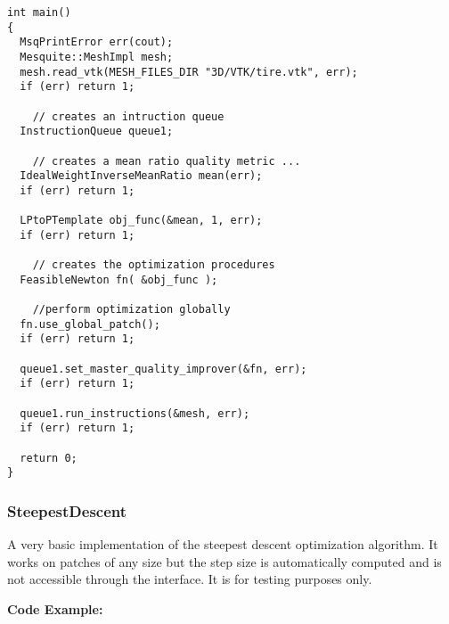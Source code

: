 \begin{lstlisting}[frame=single]
int main()
{     
  MsqPrintError err(cout);
  Mesquite::MeshImpl mesh;
  mesh.read_vtk(MESH_FILES_DIR "3D/VTK/tire.vtk", err);
  if (err) return 1;
  
    // creates an intruction queue
  InstructionQueue queue1;

    // creates a mean ratio quality metric ...
  IdealWeightInverseMeanRatio mean(err);
  if (err) return 1;
  
  LPtoPTemplate obj_func(&mean, 1, err);
  if (err) return 1;
  
    // creates the optimization procedures
  FeasibleNewton fn( &obj_func );

    //perform optimization globally
  fn.use_global_patch();
  if (err) return 1;
  
  queue1.set_master_quality_improver(&fn, err); 
  if (err) return 1;

  queue1.run_instructions(&mesh, err); 
  if (err) return 1;
  
  return 0;
}
\end{lstlisting}


\subsubsection{SteepestDescent}
A very basic implementation of the steepest descent optimization algorithm.  It works on patches of any size but the step size is automatically computed and is not accessible through the interface. It is for testing purposes only. 

\textbf{Code Example:}

